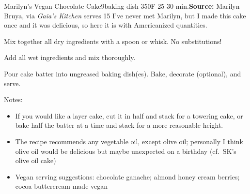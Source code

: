 \begin{recipe}[]{Marilyn's Vegan Chocolate Cake}{9\inch{}\inch baking dish \hfill 350\0F \hfill 25-30 min.}{\textbf{Source:} Marilyn Bruya, via \textit{Gaia's Kitchen} \hfill serves 15}
 \freeform I've never met Marilyn, but I made this cake once and it was delicious, so here it is with Americanized quantities.

 Mix together all dry ingredients with a spoon or whisk. No substitutions!

 Add all wet ingredients and mix thoroughly.

 \newstep Pour cake batter into ungreased baking dish(es). Bake, decorate (optional), and serve.

 \freeform Notes:
 \begin{itemize}
  \item If you would like a layer cake, cut it in half and stack for a towering cake, or bake half the batter at a time and stack for a more reasonable height.
  \item The recipe recommends any vegetable oil, except olive oil; personally I think olive oil would be delicious but maybe unexpected on a birthday (cf.\ SK's olive oil cake)
  \item Vegan serving suggestions: chocolate ganache; almond honey cream \And berries; cocoa buttercream made vegan
 \end{itemize}
\end{recipe}
